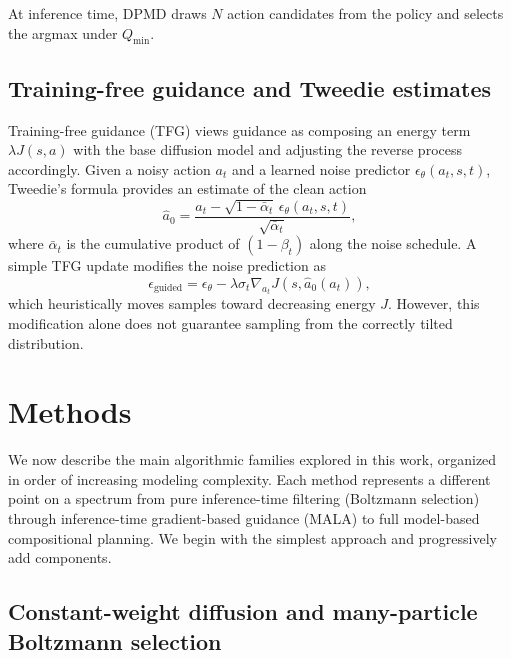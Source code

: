 \documentclass{article}
\theoremstyle{plain}
\theoremstyle{definition}
\theoremstyle{remark}
\begin{document}
At inference time, DPMD draws $N$ action candidates from the policy and selects the argmax under $Q_{\min}$.

\subsection{Training-free guidance and Tweedie estimates}

Training-free guidance (TFG) \citep{ye2024tfg,bansal2023universal} views guidance as composing an energy term $\lambda J(s,a)$ with the base diffusion model and adjusting the reverse process accordingly.
Given a noisy action $a_t$ and a learned noise predictor $\epsilon_\theta(a_t,s,t)$, Tweedie's formula provides an estimate of the clean action
\begin{equation}
  \hat{a}_0 = \frac{a_t - \sqrt{1-\bar{\alpha}_t}\, \epsilon_\theta(a_t,s,t)}{\sqrt{\bar{\alpha}_t}},
\end{equation}
where $\bar{\alpha}_t$ is the cumulative product of $(1-\beta_t)$ along the noise schedule.
A simple TFG update modifies the noise prediction as
\begin{equation}
  \epsilon_{\text{guided}} = \epsilon_\theta - \lambda \sigma_t \nabla_{a_t} J(s,\hat{a}_0(a_t)),
\end{equation}
which heuristically moves samples toward decreasing energy $J$.
However, this modification alone does not guarantee sampling from the correctly tilted distribution.

\section{Methods}
\label{sec:methods}

We now describe the main algorithmic families explored in this work, organized in order of increasing modeling complexity.
Each method represents a different point on a spectrum from pure inference-time filtering (Boltzmann selection) through inference-time gradient-based guidance (MALA) to full model-based compositional planning.
We begin with the simplest approach and progressively add components.

\subsection{Constant-weight diffusion and many-particle Boltzmann selection}
\label{sec:boltzmann}
\end{document}
